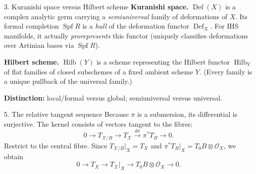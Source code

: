 \documentclass[aspectratio=169]{beamer}
\begin{document}
\begin{frame}{3. Kuranishi space versus Hilbert scheme}
\small
\textbf{Kuranishi space.}
$\operatorname{Def}(X)$ is a complex analytic germ carrying a
\emph{semiuniversal} family of deformations of $X$.
Its formal completion $\operatorname{Spf}R$ is a
\emph{hull} of the deformation functor $\operatorname{Def}_X$.
For IHS manifolds, it actually \emph{prorepresents} this functor
(uniquely classifies deformations over Artinian bases via $\operatorname{Spf}R$).

\medskip
\textbf{Hilbert scheme.}
$\operatorname{Hilb}(Y)$ is a scheme representing the Hilbert
functor $\operatorname{Hilb}_Y$ of flat families of closed
subschemes of a fixed ambient scheme $Y$.
(Every family is a unique pullback of the universal family.)

\medskip
\textbf{Distinction:} local/formal versus global;
semiuniversal versus universal.
\end{frame}

\begin{frame}{5. The relative tangent sequence}
Because $\pi$ is a submersion, its differential is surjective.
The kernel consists of vectors tangent to the fibres:
\[
0\longrightarrow T_{\mathcal X/B}
\longrightarrow T_{\mathcal X}
\xrightarrow{d\pi}\pi^*T_B\longrightarrow0.
\]
Restrict to the central fibre. Since
$T_{\mathcal X/B}|_X=T_X$ and
$\pi^*T_B|_X=T_0B\otimes\mathcal O_X$, we obtain
\[
\boxed{0\longrightarrow T_X\longrightarrow
T_{\mathcal X}|_X\longrightarrow
T_0B\otimes\mathcal O_X\longrightarrow0.}
\]
\end{frame}
\end{document}
